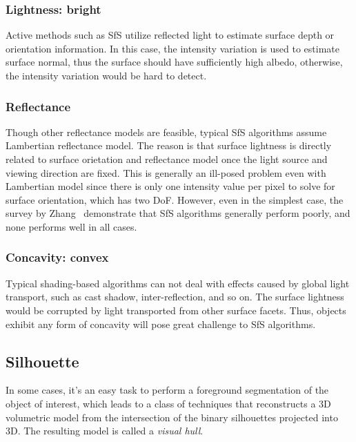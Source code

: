 \subsubsection{Lightness: bright}
Active methods such as SfS utilize reflected light to estimate surface depth or orientation information. In this case, the intensity variation is used to estimate surface normal, thus the surface should have sufficiently high albedo, otherwise, the intensity variation would be hard to detect.

\subsubsection{Reflectance}
Though other reflectance models are feasible, typical SfS algorithms assume Lambertian reflectance model. The reason is that surface lightness is directly related to surface orietation and reflectance model once the light source and viewing direction are fixed. This is generally an ill-posed problem even with Lambertian model since there is only one intensity value per pixel to solve for surface orientation, which has two DoF. However, even in the simplest case, the survey by Zhang~\cite{zhang1999shape} demonstrate that SfS algorithms generally perform poorly, and none performs well in all cases.

\subsubsection{Concavity: convex}
Typical shading-based algorithms can not deal with effects caused by global light transport, such as cast shadow, inter-reflection, and so on. The surface lightness would be corrupted by light transported from other surface facets. Thus, objects exhibit any form of concavity will pose great challenge to SfS algorithms.

\subsection{Silhouette}
In some cases, it's an easy task to perform a foreground segmentation of the object of interest, which leads to a class of techniques that reconstructs a 3D volumetric model from the intersection of the binary silhouettes projected into 3D. The resulting model is called a \textit{visual hull}.

